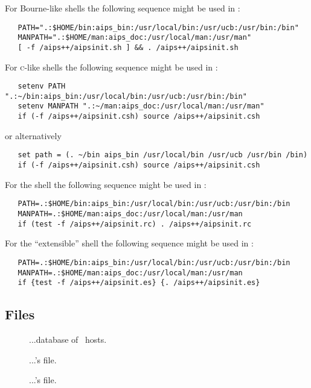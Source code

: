 \noindent
For Bourne-like shells the following sequence might be used in
:

\begin{verbatim}
   PATH=".:$HOME/bin:aips_bin:/usr/local/bin:/usr/ucb:/usr/bin:/bin"
   MANPATH=".:$HOME/man:aips_doc:/usr/local/man:/usr/man"
   [ -f /aips++/aipsinit.sh ] && . /aips++/aipsinit.sh
\end{verbatim}

\noindent
For \textsc{c}-like shells the following sequence might be used in
:

\begin{verbatim}
   setenv PATH ".:~/bin:aips_bin:/usr/local/bin:/usr/ucb:/usr/bin:/bin"
   setenv MANPATH ".:~/man:aips_doc:/usr/local/man:/usr/man"
   if (-f /aips++/aipsinit.csh) source /aips++/aipsinit.csh
\end{verbatim}

\noindent
or alternatively

\begin{verbatim}
   set path = (. ~/bin aips_bin /usr/local/bin /usr/ucb /usr/bin /bin)
   if (-f /aips++/aipsinit.csh) source /aips++/aipsinit.csh
\end{verbatim}

\noindent
For the  shell the following sequence might be used in
:

\begin{verbatim}
   PATH=.:$HOME/bin:aips_bin:/usr/local/bin:/usr/ucb:/usr/bin:/bin
   MANPATH=.:$HOME/man:aips_doc:/usr/local/man:/usr/man
   if (test -f /aips++/aipsinit.rc) . /aips++/aipsinit.rc
\end{verbatim}

\noindent
For the  ``extensible'' shell the following sequence might be used
in :

\begin{verbatim}
   PATH=.:$HOME/bin:aips_bin:/usr/local/bin:/usr/ucb:/usr/bin:/bin
   MANPATH=.:$HOME/man:aips_doc:/usr/local/man:/usr/man
   if {test -f /aips++/aipsinit.es} {. /aips++/aipsinit.es}
\end{verbatim}

\subsection*{Files}

\begin{description}
\item[]
...database of \aipspp\ hosts.

\item[]
...'s  file.

\item[]
...'s  file.
\end{description}

